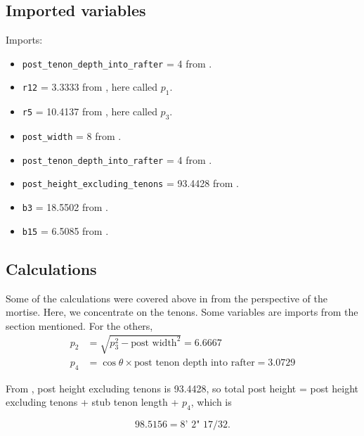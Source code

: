 \documentclass{article}\usepackage[]{graphicx}\usepackage[]{xcolor}
\begin{document}
\subsection{Imported variables}
Imports: 
\begin{itemize}
  \item \verb+post_tenon_depth_into_rafter+ = 4 from . 
  \item \verb+r12+ = 3.3333 from , here called $p_1$. 
  \item \verb+r5+ = 10.4137 from , here called $p_3$. 
  \item \verb+post_width+ = 8 from . 
  \item \verb+post_tenon_depth_into_rafter+ = 4 from .
  \item \verb+post_height_excluding_tenons+ = 93.4428 from .
  \item \verb+b3+ = 18.5502 from . 
  \item \verb+b15+ = 6.5085 from . 
\end{itemize}

\subsection{Calculations} \label{posts-plan-calculations}



Some of the calculations were covered above in  from the perspective of the mortise. Here, we concentrate on the tenons. Some variables are imports from the section mentioned. For the others, 
\begin{align*}
  p_2 &= \sqrt{p_3^2 - \text{post width}^2} = 6.6667\\
  p_4 &= \cos\theta\times\text{post tenon depth into rafter} = 3.0729
\end{align*}

From , post height excluding tenons is 93.4428, so total post height = post height excluding tenons + stub tenon length + $p_4$, which is 

\[ \boxed{98.5156 = \text{8' 2" 17/32}.} \]
\end{document}
